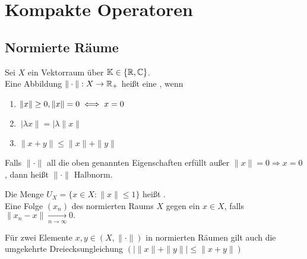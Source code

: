 
\chapter*{Kompakte Operatoren}  \setcounter{section}{1}

\section{Normierte R{\"a}ume}

\begin{definition}
Sei $X$ ein Vektorraum über $\mathbb{K} \in\{ \mathbb{R}, \mathbb{C} \}$. \\
Eine Abbildung  $\| \cdot \|: X \rightarrow \mathbb{R}_{+}$ hei{\ss}t eine , wenn
\begin{enumerate}
	\item $ \| x \| \geq 0, \| x \| = 0 \iff x = 0 $
	\item $\ | \lambda x \| = | \lambda \| x \| $
	\item $ \| x + y \| \leq \| x \| + \| y \| $
\end{enumerate}	
\end{definition}

\begin{bemerkung} Falls $ \| \cdot \| $ all die oben genannten Eigenschaften erfüllt au{\ss}er $ \| x \| = 0 \Rightarrow x = 0 $, dann hei{\ss}t $ \| \cdot \| $ Halbnorm.
\end{bemerkung}

\begin{vereinbarung}
Die Menge $ U_{X} = \{ x \in X:  \|x \| \leq 1 \}$ hei{\ss}t . \\
Eine Folge $(x_{n})$ des normierten Raums $X$  gegen ein $ x \in X $, falls  $\| x_{n} - x \| \xrightarrow[n \rightarrow \infty]{} 0. $	
\end{vereinbarung}


\begin{bemerkung}
Für zwei Elemente $x, y \in (X, \| \cdot \|)$ in normierten Räumen gilt auch die umgekehrte Dreiecksungleichung $( | \| x \| + \| y \| | \leq \| x + y \|)$
\end{bemerkung}

